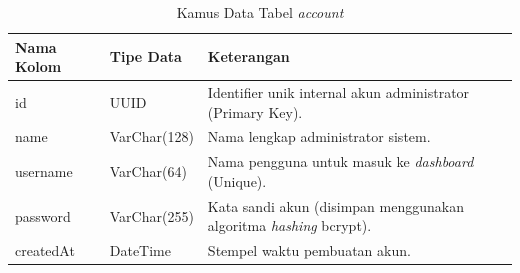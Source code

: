 \begin{table}[t]
    \centering
    \caption{Kamus Data Tabel \textit{account}}
    \label{tab:kamus_account}
    \begin{tabular}{|l|l|p{8cm}|}
        \hline
        \textbf{Nama Kolom} & \textbf{Tipe Data} & \textbf{Keterangan} \\
        \hline
        id & UUID & Identifier unik internal akun administrator (Primary Key). \\
        \hline
        name & VarChar(128) & Nama lengkap administrator sistem. \\
        \hline
        username & VarChar(64) & Nama pengguna untuk masuk ke \textit{dashboard} (Unique). \\
        \hline
        password & VarChar(255) & Kata sandi akun (disimpan menggunakan algoritma \textit{hashing} bcrypt). \\
        \hline
        createdAt & DateTime & Stempel waktu pembuatan akun. \\
        \hline
    \end{tabular}
\end{table}